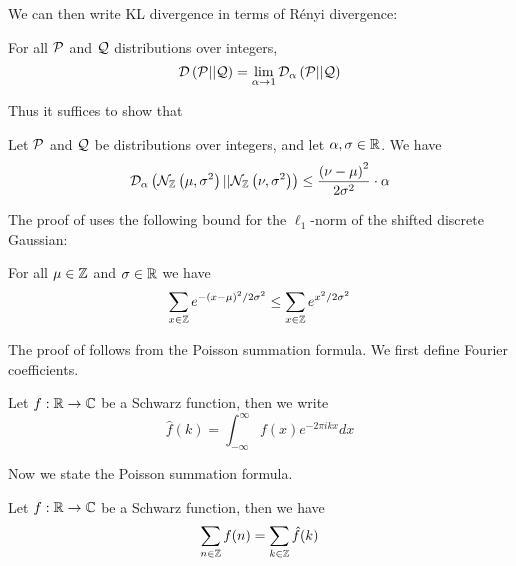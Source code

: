 \documentclass{article}
\begin{document}
We can then write KL divergence in terms of R\'enyi divergence:
\begin{lemma}
	For all $\mathcal{P}$ and $\mathcal{Q}$ distributions over integers,
	\begin{equation}
		\mathcal{D}\left(\mathcal{P} || \mathcal{Q}\right) = \lim_{\alpha\rightarrow 1}\mathcal{D}_\alpha\left(\mathcal{P} || \mathcal{Q}\right)
	\end{equation}
\end{lemma}

Thus it suffices to show that
\begin{lemma}
	\label{lemma:DG-renyi-bound}
	Let $\mathcal{P}$ and $\mathcal{Q}$ be distributions over integers, and let $\alpha, \sigma\in\mathbb{R}$. We have
	\begin{equation}
		\mathcal{D}_\alpha\left(\mathcal{N}_{\mathbb{Z}}\left(\mu, \sigma^2\right) || \mathcal{N}_{\mathbb{Z}}\left(\nu, \sigma^2\right)\right) \leq \frac{\left(\nu - \mu\right)^2}{2\sigma^2} \cdot \alpha
	\end{equation}
\end{lemma}

The proof of  uses the following bound for the $\ell_1$-norm of the shifted discrete Gaussian:
\begin{lemma}
	\label{lemma:norm-shifted-DG}
	For all $\mu\in\mathbb{Z}$ and $\sigma\in\mathbb{R}$ we have
	\begin{equation}
		\sum_{x\in\mathbb{Z}}e^{-\left(x-\mu\right)^2 / 2\sigma^2} \leq \sum_{x\in\mathbb{Z}}e^{x^2 / 2\sigma^2} 
	\end{equation}
\end{lemma}

The proof of  follows from the Poisson summation formula.
We first define Fourier coefficients.
\begin{definition}
	Let $f:\mathbb{R}\rightarrow\mathbb{C}$ be a Schwarz function, then we write
	\begin{equation}
		\hat{f}(k)=\int_{-\infty}^{\infty} f(x)e^{-2\pi i k x} dx
	\end{equation}
\end{definition}

Now we state the Poisson summation formula.
\begin{lemma}
	\label{lemma:Poisson-summation}
	Let $f:\mathbb{R}\rightarrow\mathbb{C}$ be a Schwarz function, then we have
	\begin{equation}
		\sum_{n\in\mathbb{Z}}f(n)=\sum_{k\in\mathbb{Z}}\hat{f}(k)
	\end{equation}
\end{lemma}
\end{document}
